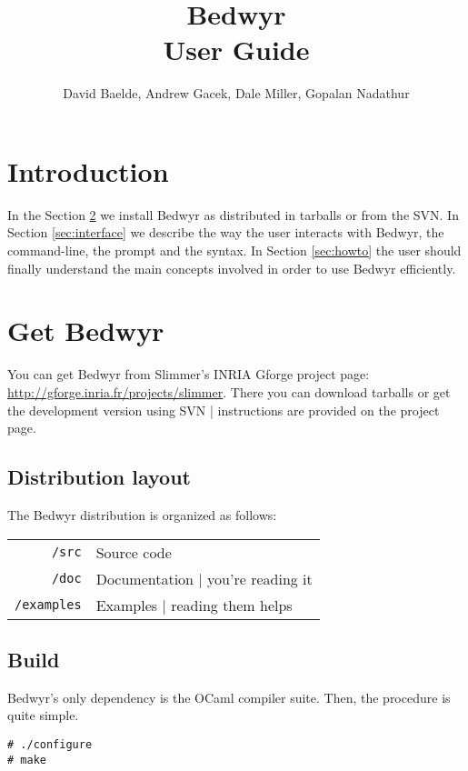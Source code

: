 \documentclass{article}
\title{{\Huge Bedwyr} \\ User Guide}
\author{David Baelde, Andrew Gacek, Dale Miller, Gopalan Nadathur}
\begin{document}
\maketitle

\tableofcontents

\section{Introduction}

In the Section \ref{sec:install} we install Bedwyr as distributed
in tarballs or from the SVN.
In Section \ref{sec:interface} we describe the way the user interacts with 
Bedwyr, the command-line, the prompt and the syntax.
In Section \ref{sec:howto} the user should finally understand the main concepts 
involved in order to use Bedwyr efficiently.

\newpage
\section{Get Bedwyr}
\label{sec:install}

You can get Bedwyr from Slimmer's INRIA Gforge project page:
\url{http://gforge.inria.fr/projects/slimmer}.
There you can download tarballs or get the development version using SVN
| instructions are provided on the project page.

\subsection{Distribution layout}

The Bedwyr distribution is organized as follows:

\begin{tabular}{rl}
  \texttt{/src}      & Source code \\
  \texttt{/doc}      &  Documentation | you're reading it \\
  \texttt{/examples} &  Examples | reading them helps
\end{tabular}

\subsection{Build}

Bedwyr's only dependency is the OCaml compiler suite.
Then, the procedure is quite simple.

\begin{verbatim}
# ./configure
# make
\end{verbatim}
\end{document}
